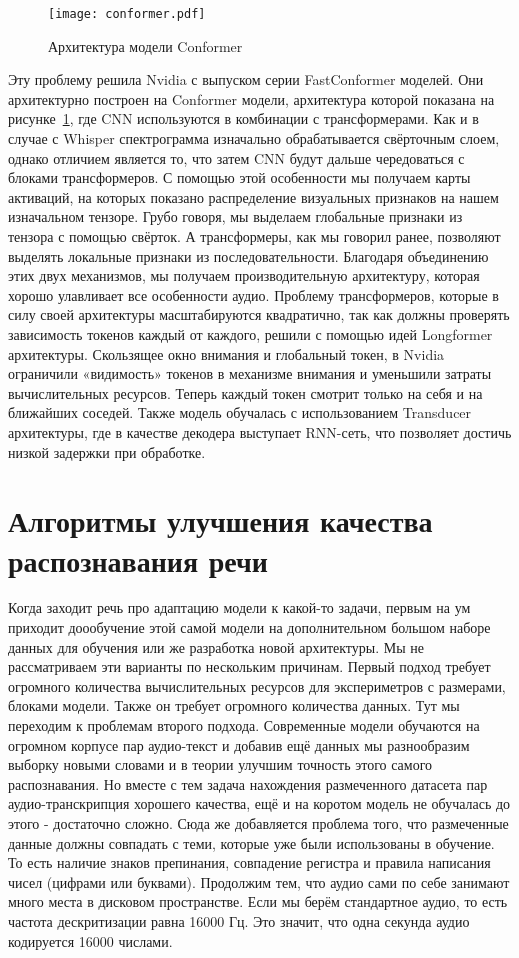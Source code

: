 \begin{figure}[!t]
  \centering
  \texttt{[image: conformer.pdf]}
  \caption{Архитектура модели Conformer}
  \label{fig:conformer}
\end{figure}

Эту проблему решила Nvidia с выпуском серии FastConformer моделей\cite{rekesh2023fast}. 
Они архитектурно построен на Conformer модели\cite{gulati2020conformers}, архитектура которой показана на рисунке~\ref{fig:conformer}, где CNN используются в комбинации с трансформерами.
Как и в случае с Whisper спектрограмма изначально обрабатывается свёрточным слоем, однако отличием является то, что затем CNN будут дальше чередоваться с блоками трансформеров.
С помощью этой особенности мы получаем карты активаций, на которых показано распределение визуальных признаков на нашем изначальном тензоре.
Грубо говоря, мы выделаем глобальные признаки из тензора с помощью свёрток.
А трансформеры, как мы говорил ранее, позволяют выделять локальные признаки из последовательности.
Благодаря объединению этих двух механизмов, мы получаем производительную архитектуру, которая хорошо улавливает все особенности аудио.
Проблему трансформеров, которые в силу своей архитектуры масштабируются квадратично, так как должны проверять зависимость токенов каждый от каждого, решили с помощью идей Longformer\cite{beltagy2020longformer} архитектуры.
Скользящее окно внимания и глобальный токен, в Nvidia ограничили «видимость» токенов в механизме внимания и уменьшили затраты вычислительных ресурсов.
Теперь каждый токен смотрит только на себя и на ближайших соседей.
Также модель обучалась с использованием Transducer архитектуры, где в качестве декодера выступает RNN-сеть, что позволяет достичь низкой задержки при обработке.


\section{Алгоритмы улучшения качества распознавания речи}
Когда заходит речь про адаптацию модели к какой-то задачи, первым на ум приходит доообучение этой самой модели на дополнительном большом наборе данных для обучения или же разработка новой архитектуры.
Мы не рассматриваем эти варианты по нескольким причинам.
Первый подход требует огромного количества вычислительных ресурсов для экспериметров с размерами, блоками модели.
Также он требует огромного количества данных.
Тут мы переходим к проблемам второго подхода.
Современные модели обучаются на огромном корпусе пар аудио-текст и добавив ещё данных мы разнообразим выборку новыми словами и в теории улучшим точность этого самого распознавания.
Но вместе с тем задача нахождения размеченного датасета пар аудио-транскрипция хорошего качества, ещё и на коротом модель не обучалась до этого - достаточно сложно.
Сюда же добавляется проблема того, что размеченные данные должны совпадать с теми, которые уже были использованы в обучение.
То есть наличие знаков препинания, совпадение регистра и правила написания чисел (цифрами или буквами).
Продолжим тем, что аудио сами по себе занимают много места в дисковом пространстве.
Если мы берём стандартное аудио, то есть частота дескритизации равна 16000 Гц.
Это значит, что одна секунда аудио кодируется 16000 числами.

